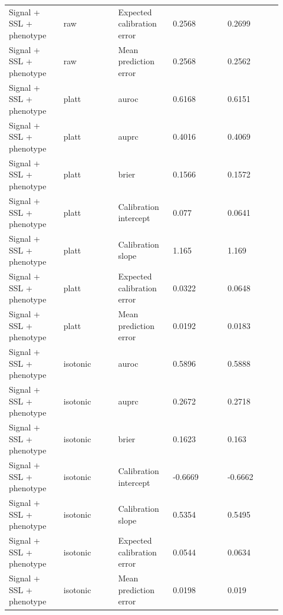 \documentclass[utf8]{frontiers_suppmat}
\begin{document}
\begin{landscape}
\begin{longtable}{L{0.184\linewidth} L{0.184\linewidth} L{0.184\linewidth} L{0.184\linewidth} L{0.184\linewidth}}
Signal + SSL + phenotype & raw & Expected calibration error & 0.\allowbreak{}2568 & 0.\allowbreak{}2699 \\
Signal + SSL + phenotype & raw & Mean prediction error & 0.\allowbreak{}2568 & 0.\allowbreak{}2562 \\
Signal + SSL + phenotype & platt & auroc & 0.\allowbreak{}6168 & 0.\allowbreak{}6151 \\
Signal + SSL + phenotype & platt & auprc & 0.\allowbreak{}4016 & 0.\allowbreak{}4069 \\
Signal + SSL + phenotype & platt & brier & 0.\allowbreak{}1566 & 0.\allowbreak{}1572 \\
Signal + SSL + phenotype & platt & Calibration intercept & 0.\allowbreak{}077 & 0.\allowbreak{}0641 \\
Signal + SSL + phenotype & platt & Calibration slope & 1.\allowbreak{}165 & 1.\allowbreak{}169 \\
Signal + SSL + phenotype & platt & Expected calibration error & 0.\allowbreak{}0322 & 0.\allowbreak{}0648 \\
Signal + SSL + phenotype & platt & Mean prediction error & 0.\allowbreak{}0192 & 0.\allowbreak{}0183 \\
Signal + SSL + phenotype & isotonic & auroc & 0.\allowbreak{}5896 & 0.\allowbreak{}5888 \\
Signal + SSL + phenotype & isotonic & auprc & 0.\allowbreak{}2672 & 0.\allowbreak{}2718 \\
Signal + SSL + phenotype & isotonic & brier & 0.\allowbreak{}1623 & 0.\allowbreak{}163 \\
Signal + SSL + phenotype & isotonic & Calibration intercept & -\allowbreak{}0.\allowbreak{}6669 & -\allowbreak{}0.\allowbreak{}6662 \\
Signal + SSL + phenotype & isotonic & Calibration slope & 0.\allowbreak{}5354 & 0.\allowbreak{}5495 \\
Signal + SSL + phenotype & isotonic & Expected calibration error & 0.\allowbreak{}0544 & 0.\allowbreak{}0634 \\
Signal + SSL + phenotype & isotonic & Mean prediction error & 0.\allowbreak{}0198 & 0.\allowbreak{}019 \\
\end{longtable}
\normalsize
\end{landscape}
\end{document}

